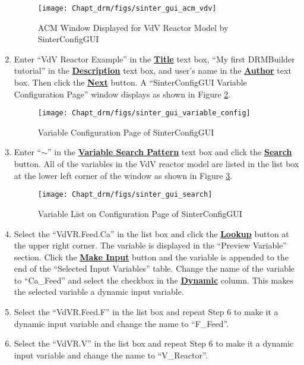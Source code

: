 \begin{enumerate}
\begin{figure}[H]
\begin{center}
			\texttt{[image: Chapt\_drm/figs/sinter\_gui\_acm\_vdv]}
			\caption{ACM Window Displayed for VdV Reactor Model by SinterConfigGUI}
			\label{fig.sinter_gui_acm_vdv}
		\end{center}
	\end{figure}
	\item Enter ``VdV Reactor Example'' in the \textbf{\underline{Title}} text box, ``My first DRMBuilder tutorial'' in the \textbf{\underline{Description}} text box, and user's name in the \textbf{\underline{Author}} text box.  Then click the \textbf{\underline{Next}} button.  A ``SinterConfigGUI Variable Configuration Page'' window displays as shown in Figure \ref{fig.sinter_gui_variable_config}.
	\begin{figure}[H]
		\begin{center}
			\texttt{[image: Chapt\_drm/figs/sinter\_gui\_variable\_config]}
			\caption{Variable Configuration Page of SinterConfigGUI}
			\label{fig.sinter_gui_variable_config}
		\end{center}
	\end{figure}
	\item Enter ``$\sim$'' in the \textbf{\underline{Variable Search Pattern}} text box and click the \textbf{\underline{Search}} button.  All of the variables in the VdV reactor model are listed in the list box at the lower left corner of the window as shown in Figure \ref{fig.sinter_gui_search}.
	\begin{figure}[H]
		\begin{center}
			\texttt{[image: Chapt\_drm/figs/sinter\_gui\_search]}
			\caption{Variable List on Configuration Page of SinterConfigGUI}
			\label{fig.sinter_gui_search}
		\end{center}
	\end{figure}
	\item Select the ``VdVR.Feed.Ca'' in the list box and click the \textbf{\underline{Lookup}} button at the upper right corner.  The variable is displayed in the ``Preview Variable'' section.  Click the \textbf{\underline{Make Input}} button and the variable is appended to the end of the ``Selected Input Variables'' table.  Change the name of the variable to ``Ca\_Feed'' and select the checkbox in the \textbf{\underline{Dynamic}} column.  This makes the selected variable a dynamic input variable.
	\item Select the ``VdVR.Feed.F'' in the list box and repeat Step 6 to make it a dynamic input variable and change the name to ``F\_Feed''.
	\item Select the ``VdVR.V'' in the list box and repeat Step 6 to make it a dynamic input variable and change the name to ``V\_Reactor''.

\end{enumerate}
